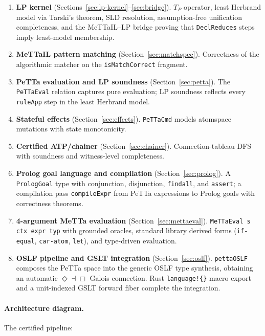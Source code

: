 \documentclass[]{article}
\newcommand{\code}[1]{\texttt{#1}}
\newcommand{\MeTTa}{\textup{MeTTa}}
\newcommand{\PeTTa}{\textup{PeTTa}}
\newcommand{\MeTTaIL}{\textup{MeTTaIL}}
\newcommand{\OSLF}{\textup{OSLF}}
\begin{document}
\begin{enumerate}
\item \textbf{LP kernel} (Sections~\ref{sec:lp-kernel}--\ref{sec:bridge}).
  $T_P$ operator, least Herbrand model via Tarski's theorem, SLD resolution,
  assumption-free unification completeness, and the \MeTTaIL{}--LP bridge
  proving that \code{DeclReduces} steps imply least-model membership.

\item \textbf{\MeTTaIL{} pattern matching} (Section~\ref{sec:matchspec}).
  Correctness of the algorithmic matcher on the \code{isMatchCorrect} fragment.

\item \textbf{\PeTTa{} evaluation and LP soundness} (Section~\ref{sec:petta}).
  The \code{PeTTaEval} relation captures pure evaluation; LP soundness reflects
  every \code{ruleApp} step in the least Herbrand model.

\item \textbf{Stateful effects} (Section~\ref{sec:effects}).
  \code{PeTTaCmd} models atomspace mutations with state monotonicity.

\item \textbf{Certified ATP/chainer} (Section~\ref{sec:chainer}).
  Connection-tableau DFS with soundness and witness-level completeness.

\item \textbf{Prolog goal language and compilation} (Section~\ref{sec:prolog}).
  A \code{PrologGoal} type with conjunction, disjunction, \code{findall}, and
  \code{assert}; a compilation pass \code{compileExpr} from \PeTTa{} expressions
  to Prolog goals with correctness theorems.

\item \textbf{4-argument \MeTTa{} evaluation} (Section~\ref{sec:mettaeval}).
  \code{MeTTaEval s ctx expr typ} with grounded oracles, standard library derived
  forms (\code{if-equal}, \code{car-atom}, \code{let}), and type-driven evaluation.

\item \textbf{\OSLF{} pipeline and GSLT integration} (Section~\ref{sec:oslf}).
  \code{pettaOSLF} composes the \PeTTa{} space into the generic \OSLF{} type
  synthesis, obtaining an automatic $\Diamond \dashv \Box$ Galois connection.
  Rust \code{language!\{\}} macro export and a unit-indexed GSLT forward fiber
  complete the integration.
\end{enumerate}

\paragraph{Architecture diagram.}
The certified pipeline:
\end{document}
